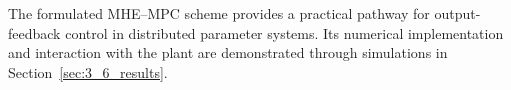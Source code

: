 The formulated MHE--MPC scheme provides a practical pathway for output-feedback control in distributed parameter systems. Its numerical implementation and interaction with the plant are demonstrated through simulations in Section~\ref{sec:3_6_results}.

